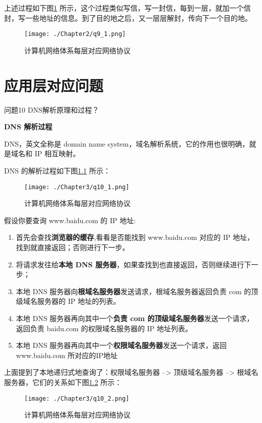\documentclass[cn,11pt,color=blue,lang=cn]{elegantbook}
\begin{document}
上述过程如下图\ref{fig9_1} 所示，这个过程类似写信，写一封信，每到一层，就加一个信封，写一些地址的信息。到了目的地之后，又一层层解封，传向下一个目的地。
\begin{figure}[htbp]
\centering
\texttt{[image: ./Chapter2/q9\_1.png]}
\caption{计算机网络体系每层对应网络协议}
\label{fig9_1}
\end{figure}

\chapter{应用层对应问题}

\begin{custom}{问题10}
DNS解析原理和过程？
\end{custom}
\begin{solution}
\begin{note} \textbf{DNS 解析过程} \end{note}
DNS，英文全称是 domain name system，域名解析系统，它的作用也很明确，就是域名和 IP 相互映射。

DNS 的解析过程如下图\ref{fig10_1} 所示：

\begin{figure}[htbp]
\centering
\texttt{[image: ./Chapter3/q10\_1.png]}
\caption{计算机网络体系每层对应网络协议}
\label{fig10_1}
\end{figure}

假设你要查询 www.baidu.com 的 IP 地址:
\begin{enumerate}
	\item 首先会查找\textbf{浏览器的缓存},看看是否能找到 www.baidu.com 对应的 IP 地址，找到就直接返回；否则进行下一步。
	\item 将请求发往给\textbf{本地 DNS 服务器}，如果查找到也直接返回，否则继续进行下一步；
	\item 本地 DNS 服务器向\textbf{根域名服务器}发送请求，根域名服务器返回负责 com 的顶级域名服务器的 IP 地址的列表。
	\item 本地 DNS 服务器再向其中一个\textbf{负责 com 的顶级域名服务器}发送一个请求，返回负责 baidu.com 的权限域名服务器的 IP 地址列表。
	\item 本地 DNS 服务器再向其中一个\textbf{权限域名服务器}发送一个请求，返回 www.baidu.com 所对应的IP地址
\end{enumerate}

上面提到了本地递归式地查询了：权限域名服务器 --> 顶级域名服务器 --> 根域名服务器，它们的关系如下图\ref{fig10_2} 所示：
\begin{figure}[htbp]
\centering
\texttt{[image: ./Chapter3/q10\_2.png]}
\caption{计算机网络体系每层对应网络协议}
\label{fig10_2}
\end{figure}


\end{solution}
\end{document}
